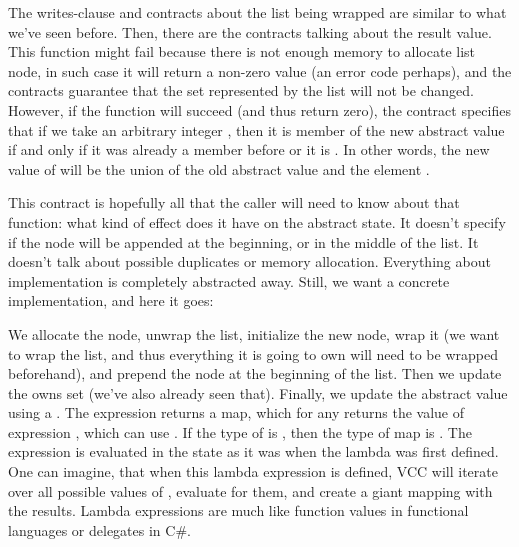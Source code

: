 
\noindent
The writes-clause and contracts about the list being wrapped are similar to what
we've seen before.
Then, there are the contracts talking about the result value.
This function might fail because there is not enough memory to allocate list node,
in such case it will return a non-zero value (an error code perhaps),
and the contracts guarantee that the set represented by the list will not be changed.
However, if the function will succeed (and thus return zero), the contract specifies
that if we take an arbitrary integer , then it is member of the new abstract
value if and only if it was already a member before or it is .
In other words, the new value of  will be the union of the old
abstract value and the element .

This contract is hopefully all that the caller will need to know about that function:
what kind of effect does it have on the abstract state. 
It doesn't specify if the node will be appended at the beginning, or in the middle
of the list.
It doesn't talk about possible duplicates or memory allocation.
Everything about implementation is completely abstracted away.
Still, we want a concrete implementation, and here it goes:


\noindent
We allocate the node, unwrap the list, initialize the new node,
wrap it (we want to wrap the list, and thus everything it is going to own will
need to be wrapped beforehand), and
prepend the node at the beginning of the list.
Then we update the owns set (we've also already seen that).
Finally, we update the abstract value using a .
The expression  returns a map, which for
any  returns the value of expression ,
which can use .
If the type of  is , then the type of map is .
The expression is evaluated in the state as it was
when the lambda was first defined.
One can imagine, that when this lambda expression is defined,
VCC will iterate over all possible values of ,
evaluate  for them, and create a giant mapping
with the results.
Lambda expressions are much like function values in functional
languages or delegates in C\#.

